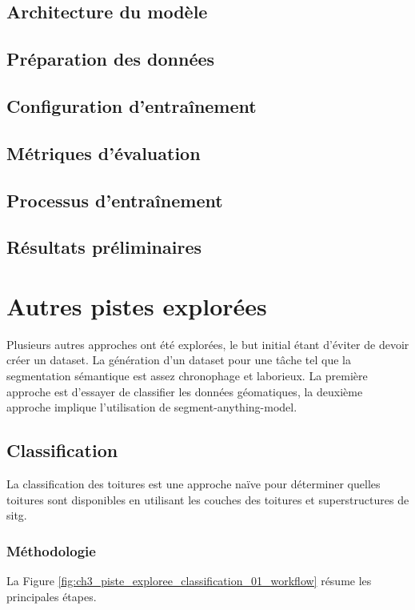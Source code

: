 \subsection{Architecture du modèle} %
\subsection{Préparation des données} %
\subsection{Configuration d'entraînement} %
\subsection{Métriques d'évaluation} %
\subsection{Processus d'entraînement} %
\subsection{Résultats préliminaires}

\newpage
\section{Autres pistes explorées}
\label{sec:pistes_explorees}
Plusieurs autres approches ont été explorées, le but initial étant d'éviter de devoir créer un dataset. La génération d'un dataset pour une tâche tel que la segmentation sémantique est assez chronophage et laborieux. La première approche est d'essayer de classifier les données géomatiques, la deuxième approche implique l'utilisation de segment-anything-model.

\subsection{Classification}
La classification des toitures est une approche naïve pour déterminer quelles toitures sont disponibles en utilisant les couches des toitures et superstructures de \acrshort{sitg}.

\subsubsection{Méthodologie}
La Figure \ref{fig:ch3_piste_exploree_classification_01_workflow} résume les principales étapes. 

